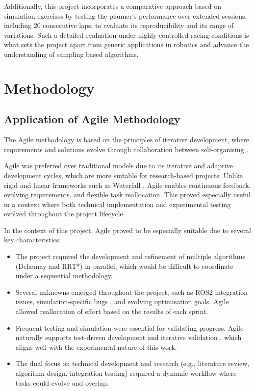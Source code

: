 \documentclass[a4paper,11pt]{report}
\begin{document}
Additionally, this project incorporates a comparative approach based on simulation exercises by testing 
the planner’s performance over extended sessions, including 20 consecutive laps, to evaluate its reproducibility 
and its range of variations. Such a detailed evaluation under highly controlled racing conditions is what sets the 
project apart from generic applications in robotics and advance the understanding of sampling based algorithms.

\chapter{Methodology}
\section{Application of Agile Methodology}

The Agile methodology is based on the principles of iterative development, 
where requirements and solutions evolve through collaboration between self-organising \cite{reference21, reference22}.

Agile was preferred over traditional models due to its iterative and adaptive development cycles, 
which are more suitable for research-based projects. Unlike rigid and linear frameworks such as Waterfall \cite{reference23}, 
Agile enables continuous feedback, evolving requirements, and flexible task reallocation. 
This proved especially useful in a context where both technical implementation and experimental testing evolved throughout the project lifecycle.

In the context of this project, Agile proved to be especially suitable due to several key characteristics:

\begin{itemize}
    \item The project required the development and refinement of multiple algorithms 
    (Delaunay and RRT*) in parallel, which would be difficult to coordinate under a sequential methodology.
    \item Several unknowns emerged throughout the project, such as ROS2 integration issues, 
    simulation-specific bugs \cite{reference15}, and evolving optimisation goals. Agile allowed reallocation of effort 
    based on the results of each sprint.
    \item Frequent testing and simulation were essential for validating progress. 
    Agile naturally supports test-driven development and iterative validation \cite{reference22}, which 
    aligns well with the experimental nature of this work.
    \item The dual focus on technical development and research (e.g., literature review, algorithm design, integration testing) 
    required a dynamic workflow where tasks could evolve and overlap.
\end{itemize}
\end{document}
